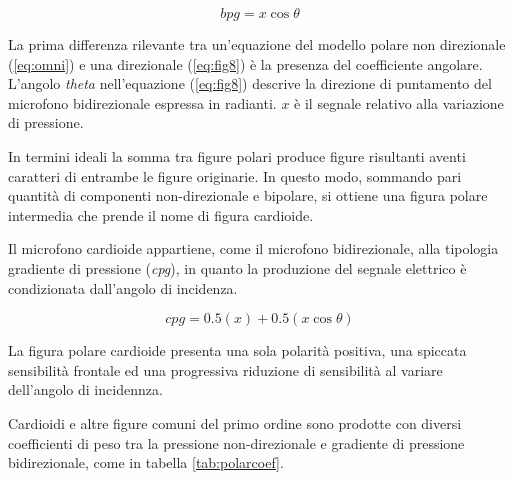 \begin{equation}
bpg = x\cos\theta
\label{eq:fig8}
\end{equation}

La prima differenza rilevante tra un'equazione del modello polare non
direzionale (\ref{eq:omni}) e una direzionale (\ref{eq:fig8}) è la
presenza del coefficiente angolare. L'angolo \emph{theta} nell'equazione
(\ref{eq:fig8}) descrive la direzione di puntamento del microfono bidirezionale
espressa in radianti. $x$ è il segnale relativo alla variazione di pressione.

In termini ideali la somma tra figure polari produce figure risultanti aventi caratteri
di entrambe le figure originarie. In questo modo, sommando pari quantità di componenti
non-direzionale e bipolare, si ottiene una figura polare intermedia che prende il
nome di figura cardioide.

Il microfono cardioide appartiene, come il microfono bidirezionale, alla tipologia
gradiente di pressione (\emph{cpg}), in quanto la produzione del segnale elettrico è condizionata
dall'angolo di incidenza.

\begin{equation}
cpg = 0.5(x) + 0.5(x\cos\theta)
\label{eq:cardioid}
\end{equation}

La figura polare cardioide presenta una sola polarità positiva, una spiccata
sensibilità frontale ed una progressiva riduzione di sensibilità al variare dell'angolo
di incidennza.

Cardioidi e altre figure comuni del primo ordine sono prodotte con diversi
coefficienti di peso tra la pressione non-direzionale e gradiente di pressione
bidirezionale, come in tabella \ref{tab:polarcoef}.


